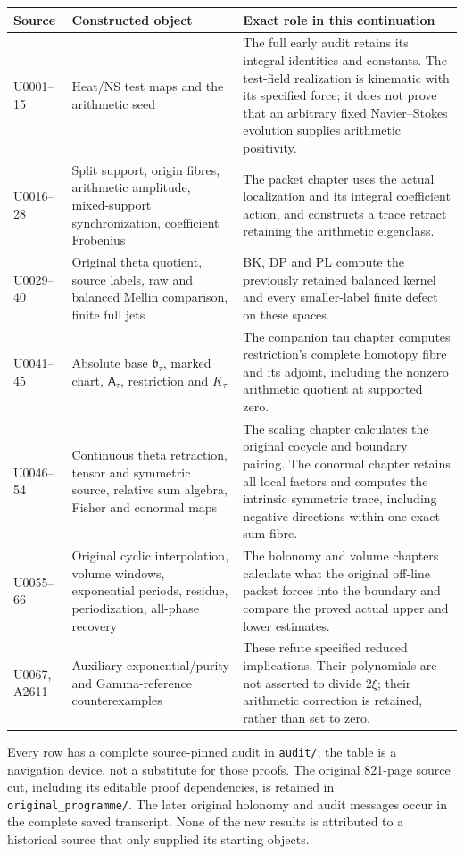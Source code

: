 \begin{longtable}{@{}p{}p{}p{}@{}}
\toprule
Source & Constructed object & Exact role in this continuation\\
\midrule\endhead
U0001--15 & Heat/NS test maps and the arithmetic seed & The full early audit
retains its integral identities and constants. The test-field realization
is kinematic with its specified force; it does not prove that an arbitrary
fixed Navier--Stokes evolution supplies arithmetic positivity.\\
U0016--28 & Split support, origin fibres, arithmetic amplitude,
mixed-support synchronization, coefficient Frobenius & The packet chapter
uses the actual localization and its integral coefficient action, and
constructs a trace retract retaining the arithmetic eigenclass.\\
U0029--40 & Original theta quotient, source labels, raw and balanced Mellin
comparison, finite full jets & BK, DP and PL compute the previously retained
balanced kernel and every smaller-label finite defect on these spaces.\\
U0041--45 & Absolute base $\mathfrak b_\tau$, marked chart,
$\mathsf A_\tau$, restriction and $K_\tau$ & The companion tau chapter
computes restriction's complete homotopy fibre and its adjoint, including
the nonzero arithmetic quotient at supported zero.\\
U0046--54 & Continuous theta retraction, tensor and symmetric source,
relative sum algebra, Fisher and conormal maps & The scaling chapter
calculates the original cocycle and boundary pairing. The conormal chapter
retains all local factors and computes the intrinsic symmetric trace,
including negative directions within one exact sum fibre.\\
U0055--66 & Original cyclic interpolation, volume windows, exponential
periods, residue, periodization, all-phase recovery & The holonomy and
volume chapters calculate what the original off-line packet forces into
the boundary and compare the proved actual upper and lower estimates.\\
U0067, A2611 & Auxiliary exponential/purity and Gamma-reference
counterexamples & These refute specified reduced implications. Their
polynomials are not asserted to divide $2\xi$; their arithmetic correction
is retained, rather than set to zero.\\
\bottomrule
\end{longtable}

Every row has a complete source-pinned audit in \texttt{audit/}; the table
is a navigation device, not a substitute for those proofs. The original
821-page source cut, including its editable proof dependencies, is retained
in \texttt{original\_programme/}. The later original holonomy and audit
messages occur in the complete saved transcript. None of the new results
is attributed to a historical source that only supplied its starting
objects.

